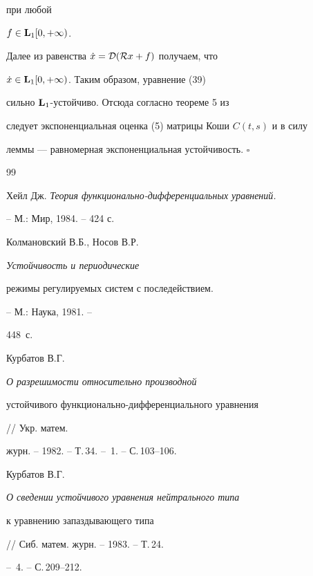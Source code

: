 при любой


$f\in\bold L_1[0,+\infty)$.


Далее из равенства $\Dot x={\cal D}({\cal R}x+f)$ получаем, что


$\Dot x\in\bold L_1[0,+\infty)$. Таким образом, уравнение (39)


сильно $\bold L_1$-устойчиво. Отсюда согласно теореме 5 из \cite{Az2}


следует экспоненциальная оценка (5) матрицы Коши $C(t,s)$ и в силу


леммы --- равномерная экспоненциальная устойчивость. $\square$








\begin{thebibliography}{99} 


 




Хейл Дж. {\em Теория функционально-дифференциальных уравнений.}


-- М.: Мир, 1984. -- 424 с.







Колмановский В.Б., Носов В.Р. {\em Устойчивость и периодические


режимы регулируемых систем с последействием.} -- М.: Наука, 1981. --


448~с.







Курбатов В.Г. {\em О разрешимости относительно производной


устойчивого функционально-дифференциального уравнения} // Укр. матем.


журн. -- 1982. -- Т.\,34. -- \No\,1. -- С.\,103--106.







Курбатов В.Г. {\em О сведении устойчивого уравнения нейтрального типа


к уравнению запаздывающего типа} // Сиб. матем. журн. -- 1983. -- Т.\,24.


-- \No\,4. -- С.\,209--212.








\end{thebibliography}
